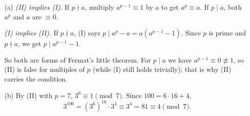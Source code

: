 (a) \emph{(II) implies (I).} If $p\nmid a$, multiply $a^{p-1}\equiv1$ by $a$ to get $a^p\equiv a$. If $p\mid a$, both $a^p$ and $a$ are $\equiv0$.

\emph{(I) implies (II).} If $p\nmid a$, (I) says $p\mid a^p-a=a\left(a^{p-1}-1\right)$. Since $p$ is prime and $p\nmid a$, we get $p\mid a^{p-1}-1$.

So both are forms of Fermat's little theorem. For $p\mid a$ we have $a^{p-1}\equiv0\not\equiv1$, so (II) is false for multiples of $p$ (while (I) still holds trivially); that is why (II) carries the condition.

(b) By (II) with $p=7$, $3^6\equiv1\pmod 7$. Since $100=6\cdot16+4$,
\[
3^{100}=\left(3^6\right)^{16}\cdot3^4\equiv3^4=81\equiv\boxed{4}\pmod7 .
\]
